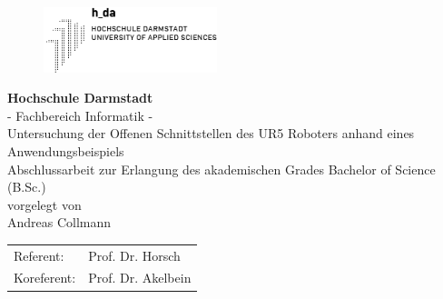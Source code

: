 \begin{titlepage}
 	  \centering
 		\begin{figure}[h]
 			\centering
 				\includegraphics[width=0.45\textwidth]{pic/h_da.png}
 			\label{fig:innoq}
 		\end{figure}	 
 		\zab {2cm}
 		\textbf{\Large Hochschule Darmstadt} \\		 
 		{\Large - Fachbereich Informatik -} \\ 		 
 		\zab {3cm}
 		{\large Untersuchung der Offenen Schnittstellen des UR5 Roboters anhand eines Anwendungsbeispiels} \\
 		\zab {2cm}
 		Abschlussarbeit zur Erlangung des akademischen Grades Bachelor of Science
 		(B.Sc.)  \\	 
 		\zab {1cm}
 		vorgelegt von \\
 		\zab {1cm}
 		{\Large Andreas Collmann} \\ 
 		\zab {2cm}
 		\begin{tabular}{ll}
 		    Referent: & Prof. Dr. Horsch\\
 		    Koreferent: & Prof. Dr. Akelbein\\
 		\end{tabular}
\end{titlepage}